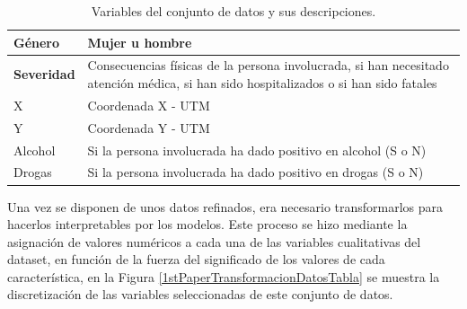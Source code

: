 \documentclass{uathesis-es}
\begin{document}
{\begin{table}[H]
\begin{center}
\begin{tabular}{|p{3cm}|p{12cm}|}
			Género  & Mujer u hombre \\ \hline
			\textbf{Severidad}  & Consecuencias físicas de la persona involucrada, si han necesitado atención médica, si han sido hospitalizados o si han sido fatales \\ \hline
			X   & Coordenada X - UTM \\ \hline
			Y   & Coordenada Y - UTM \\ \hline
			Alcohol & Si la persona involucrada ha dado positivo en alcohol (S o N) \\ \hline
			Drogas & Si la persona involucrada ha dado positivo en drogas (S o N) \\ \hline \hline
		\end{tabular}
	\end{center}
	\caption{Variables del conjunto de datos y sus descripciones.}
	\label{Datadescription}
\end{table}

Una vez se disponen de unos datos refinados, era necesario transformarlos para hacerlos interpretables por los modelos. Este proceso se hizo mediante la asignación de valores numéricos a cada una de las variables cualitativas del dataset, en función de la fuerza del significado de los valores de cada característica, en la Figura \ref{1stPaperTransformacionDatosTabla} se muestra la discretización de las variables seleccionadas de este conjunto de datos.

}
\end{document}
